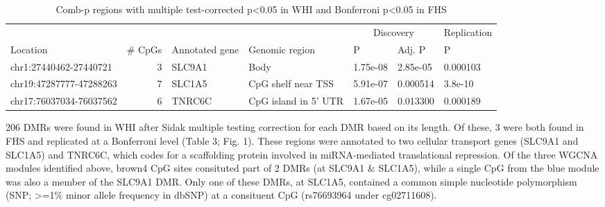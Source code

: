 \documentclass[]{article}
\theoremstyle{definition}
\theoremstyle{definition}
\theoremstyle{definition}
\theoremstyle{remark}
\begin{document}
\begin{table}

\caption{\label{tab:combp-results}Comb-p regions with multiple test-corrected p<0.05 in WHI and Bonferroni p<0.05 in FHS}
\centering
\begin{tabular}[t]{lrlllll}
\toprule
\multicolumn{1}{c}{} & \multicolumn{1}{c}{} & \multicolumn{1}{c}{} & \multicolumn{1}{c}{} & \multicolumn{2}{c}{Discovery} & \multicolumn{1}{c}{Replication} \\
\cmidrule(l{2pt}r{2pt}){5-6} \cmidrule(l{2pt}r{2pt}){7-7}
Location & \# CpGs & Annotated gene & Genomic region & P & Adj. P & P\\
\midrule
chr1:27440462-27440721 & 3 & SLC9A1 & Body & 1.75e-08 & 2.85e-05 & 0.000103\\
chr19:47287777-47288263 & 7 & SLC1A5 & CpG shelf near TSS & 5.91e-07 & 0.000514 & 3.8e-10\\
chr17:76037034-76037562 & 6 & TNRC6C & CpG island in 5' UTR & 1.67e-05 & 0.013300 & 0.000189\\
\bottomrule
\end{tabular}
\end{table}

206 DMRs were found in WHI after Sidak multiple testing correction for
each DMR based on its length. Of these, 3 were both found in FHS and
replicated at a Bonferroni level (Table 3; Fig. 1). These regions were
annotated to two cellular transport genes (SLC9A1 and SLC1A5) and
TNRC6C, which codes for a scaffolding protein involved in miRNA-mediated
translational repression. Of the three WGCNA modules identified above,
brown4 CpG sites consituted part of 2 DMRs (at SLC9A1 \& SLC1A5), while
a single CpG from the blue module was also a member of the SLC9A1 DMR.
Only one of these DMRs, at SLC1A5, contained a common simple nucleotide
polymorphism (SNP; \textgreater{}=1\% minor allele frequency in dbSNP)
at a consituent CpG (rs76693964 under cg02711608).
\end{document}

